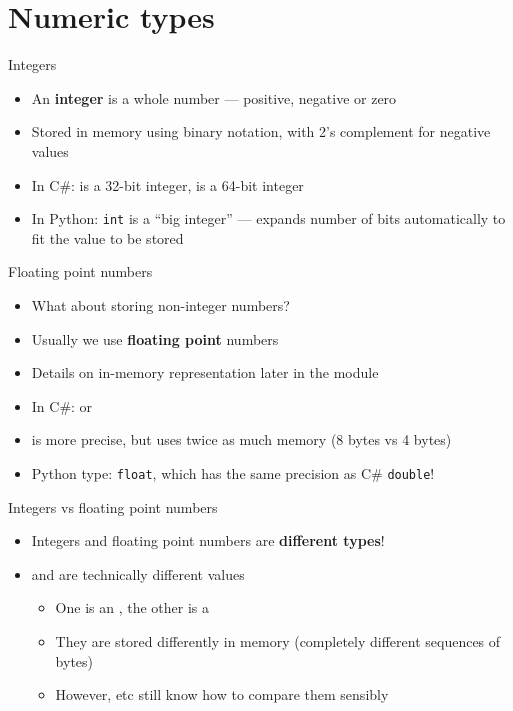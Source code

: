 \part{Numeric types}
\frame{\partpage}

\begin{frame}{Integers}
	\begin{itemize}
		\pause\item An \textbf{integer} is a whole number --- positive, negative or zero
		\pause\item Stored in memory using binary notation, with 2's complement for negative values
		\pause\item In C\#:  is a 32-bit integer,  is a 64-bit integer
		\pause\item In Python: \lstinline{int} is a ``big integer'' --- expands number of bits automatically to fit the value to be stored
	\end{itemize}
\end{frame}

\begin{frame}{Floating point numbers}
	\begin{itemize}
		\pause\item What about storing non-integer numbers?
		\pause\item Usually we use \textbf{floating point} numbers
		\pause\item Details on in-memory representation later in the module
		\pause\item In C\#:  or 
		\pause\item {} is more precise, but uses twice as much memory (8 bytes vs 4 bytes)
		\pause\item Python type: \lstinline{float}, which has the same precision as C\# \lstinline{double}!
	\end{itemize}
\end{frame}

\begin{frame}{Integers vs floating point numbers}
	\begin{itemize}
		\pause\item Integers and floating point numbers are \textbf{different types}!
		\pause\item {} and  are technically different values
			\begin{itemize}
				\pause\item One is an , the other is a 
				\pause\item They are stored differently in memory (completely different sequences of bytes)
				\pause\item However, \csinline{==} etc still know how to compare them sensibly
			\end{itemize}
	\end{itemize}
\end{frame}

